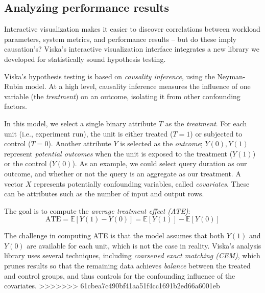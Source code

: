 \subsection{Analyzing performance results}
Interactive visualization makes it easier to discover correlations
between workload parameters, system metrics, and performance results
-- but do these imply causation's? Viska's
interactive visualization interface integrates a new library we
developed for statistically sound hypothesis testing.

Viska's hypothesis testing is based on \emph{causality inference},
using the Neyman-Rubin model. At a high level, causality inference
measures the influence of one variable (the \emph{treatment})
on an outcome, isolating it from other confounding factors.

In this model, we select a single binary attribute $T$ as the
\emph{treatment}.  For each unit (i.e., experiment run), the unit is either
treated ($T = 1$) or subjected to control ($T = 0$).  Another attribute $Y$ is
selected as the \emph{outcome}; $Y(0), Y(1)$ represent \emph{potential
outcomes} when the unit is exposed to the treatment ($Y(1)$) or the control
($Y(0)$). As an example, we could select query duration as our outcome, and
whether or not the query is an aggregate as our treatment.
A vector $X$ represents potentially confounding variables, called \emph{covariates}.
These can be attributes such as the number of input and output rows.

The goal is to compute the \emph{average treatment effect (ATE)}:
$$
\text{ATE} = \mathbb{E}[Y(1) - Y(0)] = \mathbb{E}[Y(1)] - \mathbb{E}[Y(0)] 
$$

The challenge in computing ATE is that the model assumes that both
$Y(1)$ and $Y(0)$ are available for each unit, which is not the case
in reality.
Viska's analysis library uses several techniques, including 
\emph{coarsened exact matching (CEM)}, which
prunes results so that the remaining data achieves \emph{balance}
between the treated and control groups, and thus controls for the confounding
influence of the covariates.
>>>>>>> 61cbea7c490bf41aa51f4cc1691b2ed66a6001eb
